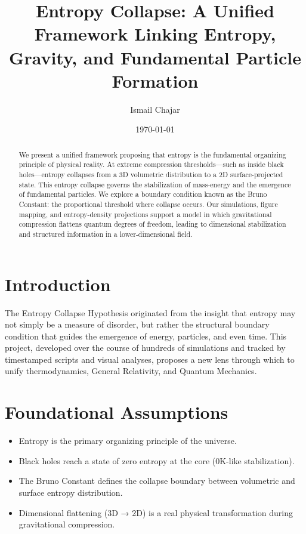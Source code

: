 \documentclass[12pt]{article}
\title{Entropy Collapse: A Unified Framework Linking Entropy, Gravity, and Fundamental Particle Formation}
\author{Ismail Chajar}
\date{\today}
\begin{document}
\maketitle

\begin{abstract}
We present a unified framework proposing that entropy is the fundamental organizing principle of physical reality. At extreme compression thresholds—such as inside black holes—entropy collapses from a 3D volumetric distribution to a 2D surface-projected state. This entropy collapse governs the stabilization of mass-energy and the emergence of fundamental particles. We explore a boundary condition known as the Bruno Constant: the proportional threshold where collapse occurs. Our simulations, figure mapping, and entropy-density projections support a model in which gravitational compression flattens quantum degrees of freedom, leading to dimensional stabilization and structured information in a lower-dimensional field.
\end{abstract}

\tableofcontents
\section{Introduction}

The Entropy Collapse Hypothesis originated from the insight that entropy may not simply be a measure of disorder, but rather the structural boundary condition that guides the emergence of energy, particles, and even time. This project, developed over the course of hundreds of simulations and tracked by timestamped scripts and visual analyses, proposes a new lens through which to unify thermodynamics, General Relativity, and Quantum Mechanics.

\section{Foundational Assumptions}
\begin{itemize}
    \item Entropy is the primary organizing principle of the universe.
    \item Black holes reach a state of zero entropy at the core (0K-like stabilization).
    \item The Bruno Constant defines the collapse boundary between volumetric and surface entropy distribution.
    \item Dimensional flattening (3D → 2D) is a real physical transformation during gravitational compression.
\end{itemize}
\end{document}
